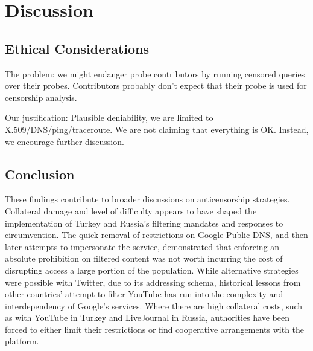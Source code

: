 \section{Discussion}

\subsection{Ethical Considerations}

The problem: we might endanger probe contributors by running censored queries over their probes.
Contributors probably don't expect that their probe is used for censorship analysis.

Our justification: Plausible deniability, we are limited to X.509/DNS/ping/traceroute.  We are not
claiming that everything is OK.  Instead, we encourage further discussion.

\subsection{Conclusion}


These findings contribute to broader discussions on anticensorship strategies.  Collateral damage and level of difficulty appears to have shaped the implementation of Turkey and Russia's filtering mandates and responses to circumvention. The quick removal of restrictions on Google Public DNS, and then later attempts to impersonate the service, demonstrated that enforcing an absolute prohibition on filtered content was not worth incurring the cost of disrupting access a large portion of the population. While alternative strategies were possible with Twitter, due to its addressing schema, historical lessons from other countries' attempt to filter YouTube has run into the complexity and interdependency of Google's services. Where there are high collateral costs, such as with YouTube in Turkey and LiveJournal in Russia, authorities have been forced to either limit their restrictions or find cooperative arrangements with the platform. 

